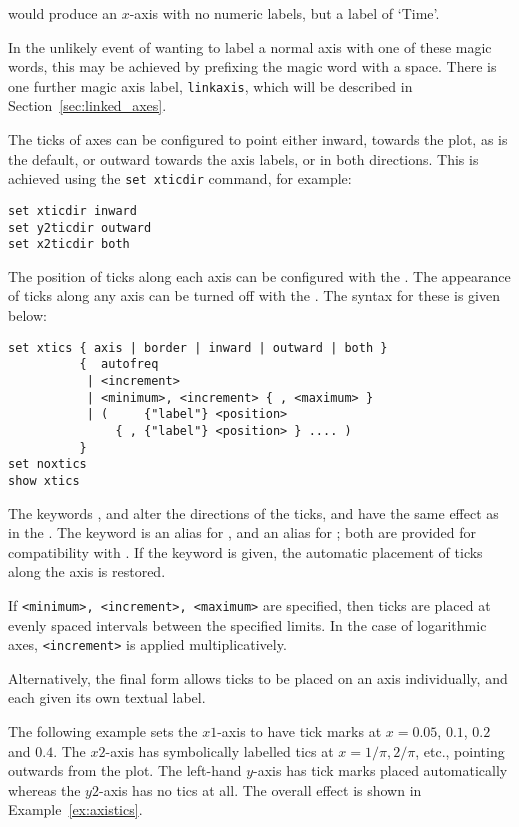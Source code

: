 \noindent would produce an $x$-axis with no numeric labels, but a label of
`Time'.

In the unlikely event of wanting to label a normal axis with one of these magic
words, this may be
achieved by prefixing the magic word with a space. There is one further magic
axis label, {\tt linkaxis}, which will be described in
Section~\ref{sec:linked_axes}.

The ticks of axes can be configured to point either inward, towards the plot,
as is the default, or outward towards the axis labels, or in both directions.
This is achieved using the {\tt set xticdir} command, for example:

\begin{verbatim}
set xticdir inward
set y2ticdir outward
set x2ticdir both
\end{verbatim}

The position of ticks along each axis can be configured with the . The appearance of ticks along any axis can be turned off with the
. The syntax for these is given below:

\begin{verbatim}
set xtics { axis | border | inward | outward | both }
          {  autofreq
           | <increment>
           | <minimum>, <increment> { , <maximum> }
           | (     {"label"} <position>
               { , {"label"} <position> } .... )
          }
set noxtics
show xtics
\end{verbatim}

The keywords ,  and  alter the
directions of the ticks, and have the same effect as in the . The keyword  is an alias for , and
 an alias for ; both are provided for
compatibility with \gnuplot. If the keyword  is given, the
automatic placement of ticks along the axis is restored.

If {\tt <minimum>, <increment>, <maximum>} are specified, then ticks are
placed at evenly spaced intervals between the specified limits. In the case of
logarithmic axes, {\tt <increment>} is applied multiplicatively.

Alternatively, the final form allows ticks to be placed on an axis
individually, and each given its own textual label.

The following example sets the $x1$-axis to have tick marks at
$x=0.05$, $0.1$, $0.2$ and $0.4$.  The $x2$-axis has symbolically labelled tics at
$x=1/\pi, 2/\pi$, etc., pointing outwards from the plot.  The left-hand
$y$-axis has tick marks placed automatically whereas the $y2$-axis has no tics
at all.  The overall effect is shown in Example~\ref{ex:axistics}.

